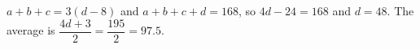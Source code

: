 $a+b+c=3(d-8)$ and $a+b+c+d=168$, so $4d-24=168$ and $d=48$. The average is $\dfrac{4d+3}2=\dfrac{195}2=\boxed{97.5}$.
